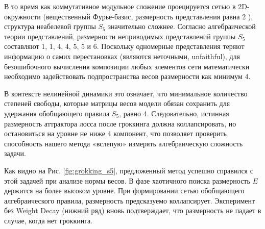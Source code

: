 \documentclass{article}
\begin{document}
В то время как коммутативное модульное сложение проецируется сетью в 2D-окружности (вещественный Фурье-базис, размерность представления равна 2 \cite{nanda2023progress}), структура неабелевой группы $S_5$ значительно сложнее. Согласно алгебраической теории представлений, размерности неприводимых представлений группы $S_5$ составляют 1, 1, 4, 4, 5, 5 и 6. Поскольку одномерные представления теряют информацию о самих перестановках (являются неточными, unfaithful), для безошибочного вычисления композиции любых элементов сети математически необходимо задействовать подпространства весов размерности как минимум 4. 

В контексте нелинейной динамики это означает, что минимальное количество степеней свободы, которые матрицы весов модели обязан сохранить для удержания обобщающего правила $S_5$, равно 4. Следовательно, истинная размерность аттрактора лосса после гроккинга должна коллапсировать, но остановиться на уровне не ниже 4 компонент, что позволяет проверить способность нашего метода «вслепую» измерять алгебраическую сложность задачи.

Как видно на Рис. \ref{fig:grokking_s5}, предложенный метод успешно справился с этой задачей при анализе нормы весов. В фазе хаотичного поиска размерность $E$ держится на более высоком уровне. При формировании сетью обобщающего алгебраического правила, размерность предсказуемо коллапсирует. Эксперимент без Weight Decay (нижний ряд) вновь подтверждает, что размерность не падает в случае, когда нет гроккинга.
\end{document}
